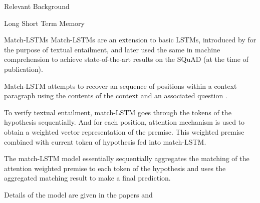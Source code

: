 \documentclass{article}
\begin{document}
\begin{psection}{Relevant Background}
\begin{psubsection}{Long Short Term Memory}
\begin{pssubsection}{Match-LSTMs}
			Match-LSTMs \citep{match-lstm} are an extension to basic LSTMs, introduced by  for the purpose of textual entailment, and later used the same in machine comprehension to achieve state-of-the-art results on the SQuAD (at the time of publication).

			Match-LSTM attempts to recover an sequence of positions within a context paragraph using the contents of the context and an associated question \citep{match-lstm-m}.

			To verify textual entailment, match-LSTM goes through the tokens of the hypothesis sequentially. And for each position, attention mechanism is used to obtain a weighted vector representation of the premise. This weighted premise combined with current token of hypothesis fed into match-LSTM.

			\sloppy
			The match-LSTM model essentially sequentially aggregates the matching of the attention weighted premise to each token of the hypothesis and uses the aggregated matching result to make a final prediction.

			Details of the model are given in the papers \cite{match-lstm} and \cite{match-lstm-mc}

		\end{pssubsection}

	\end{psubsection}

\end{psection}
\end{document}

